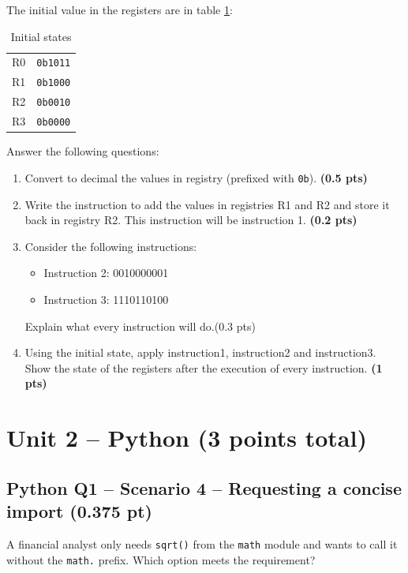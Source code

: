 \documentclass[10pt]{article}
\providecommand{\textt}[1]{\texttt{#1}}
\let\OldSection\section
\renewcommand{\section}{\clearpage\OldSection}
\begin{document}
The initial value in the registers are in table \ref{tab:initial_state}: 

\begin{table}[H]
    \begin{tabular}{ll}
        R0 & \textt{0b1011}\\
        R1 & \textt{0b1000}\\
        R2 & \textt{0b0010}\\
        R3 & \textt{0b0000} \\ 
    \end{tabular}
    \caption{Initial states}
    \label{tab:initial_state}
\end{table}



Answer the following questions: 
\begin{enumerate}
    \item Convert to decimal the values in registry (prefixed with \verb|0b|). \textbf{(0.5 pts)}
    
\vspace{1.2cm}
    \item Write the instruction to add the values in registries R1 and R2 and store it back in registry R2. This instruction will be instruction 1. \textbf{(0.2 pts)}\\
    
\vspace{1.2cm}
    \item Consider the following instructions:
    \begin{itemize}
        \item Instruction 2: 0010000001
        \item Instruction 3: 1110110100
    \end{itemize}
    Explain what every instruction will do.(0.3 pts)

\vspace{1.2cm}
    \item Using the initial state, apply instruction1, instruction2 and instruction3. Show the state
of the registers after the execution of every instruction. \textbf{(1 pts)}      

\vspace{1.2cm}
\end{enumerate}


\section*{Unit 2 -- Python (3 points total)}
\subsection*{Python Q1 -- Scenario 4 -- Requesting a concise import (0.375 pt)}
A financial analyst only needs \texttt{sqrt()} from the \texttt{math}
module and wants to call it without the \texttt{math.} prefix. Which
option meets the requirement?
\end{document}
